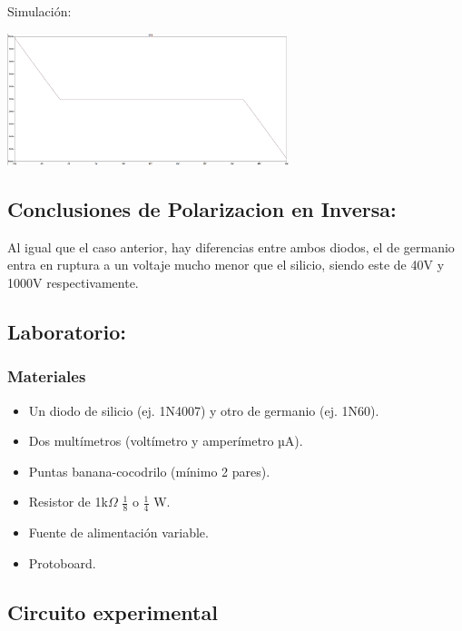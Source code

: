 \vspace{0.5cm}

Simulación:

\includegraphics[width=8.2cm]{imagenes/simulacion4.png}\\

\subsection{Conclusiones de Polarizacion en Inversa:}

Al igual que el caso anterior, hay diferencias entre ambos diodos, el de germanio entra en ruptura a un voltaje mucho menor que el silicio, siendo este de 40V y 1000V respectivamente.


\subsection{Laboratorio:}

\subsubsection*{Materiales}

\begin{itemize}
    \item Un diodo de silicio (ej. 1N4007) y otro de germanio (ej. 1N60).
    \item Dos multímetros (voltímetro y amperímetro µA).
    \item Puntas banana-cocodrilo (mínimo 2 pares).
    \item Resistor de 1k$\Omega$ $\frac{1}{8}$ o $\frac{1}{4}$ W.
    \item Fuente de alimentación variable.
    \item Protoboard.
\end{itemize}

\subsection*{Circuito experimental}

